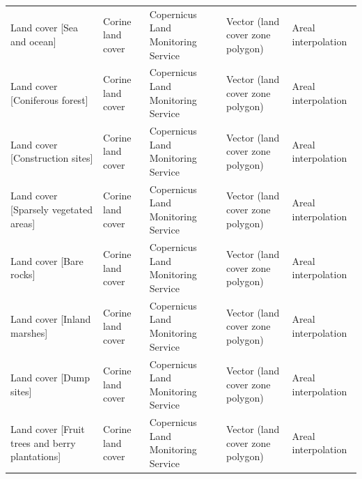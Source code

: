 \documentclass[fleqn,10pt]{wlscirep}
\begin{document}
\begin{longtable}{p{}p{}p{}p{}p{}}
                                                                                Land cover [Sea and ocean] &                  Corine land cover  &                                         Copernicus Land Monitoring Service  &  Vector (land cover zone polygon)  &                            Areal interpolation  \\
                                                                            Land cover [Coniferous forest] &                  Corine land cover  &                                         Copernicus Land Monitoring Service  &  Vector (land cover zone polygon)  &                            Areal interpolation  \\
                                                                        Land cover [Construction sites] &                  Corine land cover  &                                         Copernicus Land Monitoring Service  &  Vector (land cover zone polygon)  &                            Areal interpolation  \\
                                                                    Land cover [Sparsely vegetated areas] &                  Corine land cover  &                                         Copernicus Land Monitoring Service  &  Vector (land cover zone polygon)  &                            Areal interpolation  \\
                                                                                Land cover [Bare rocks] &                  Corine land cover  &                                         Copernicus Land Monitoring Service  &  Vector (land cover zone polygon)  &                            Areal interpolation  \\
                                                                            Land cover [Inland marshes] &                  Corine land cover  &                                         Copernicus Land Monitoring Service  &  Vector (land cover zone polygon)  &                            Areal interpolation  \\
                                                                                Land cover [Dump sites] &                  Corine land cover  &                                         Copernicus Land Monitoring Service  &  Vector (land cover zone polygon)  &                            Areal interpolation  \\
                                                            Land cover [Fruit trees and berry plantations] &                  Corine land cover  &                                         Copernicus Land Monitoring Service  &  Vector (land cover zone polygon)  &                            Areal interpolation  \\

\end{longtable}
\end{document}
